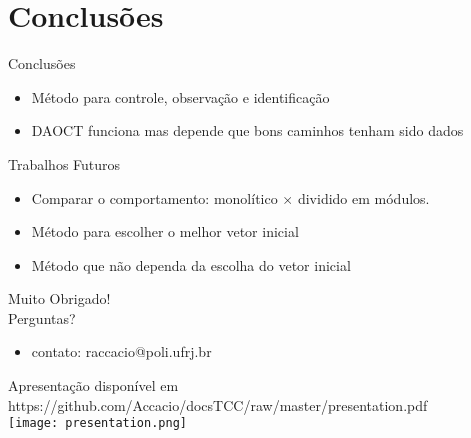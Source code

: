 
\section{Conclusões}

\begin{frame}{Conclusões}
\begin{itemize}\pause
\item Método para controle, observação e identificação\pause 
\item DAOCT funciona mas depende que bons caminhos tenham sido dados\pause 
\end{itemize}
\begin{block}{Trabalhos Futuros}
\begin{itemize}
\item Comparar o comportamento: monolítico $\times$ dividido em módulos. \pause
\item Método para escolher o melhor vetor inicial\pause 
\item Método que não dependa da escolha do vetor inicial
\end{itemize}
\end{block}
\end{frame}

\begin{frame}{}
  \Large{Muito Obrigado!}\\
  \large{\quad Perguntas?}
\begin{center}
\begin{itemize}
\item \small contato: raccacio@poli.ufrj.br
\end{itemize}
\end{center}
\footnotesize{ Apresentação disponível em
  https://github.com/Accacio/docsTCC/raw/master/presentation.pdf}\\
\texttt{[image: presentation.png]}
\end{frame}
